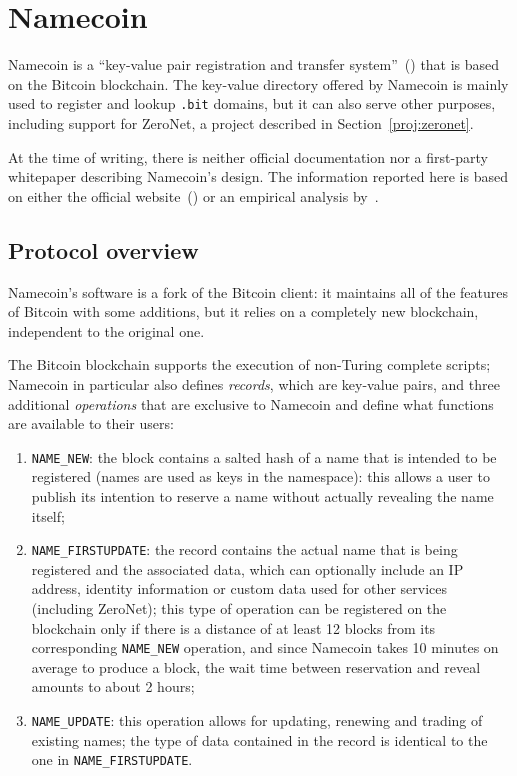 \documentclass[mscthesis]{usiinfthesis}
\begin{document}
\section{Namecoin}\label{proj:namecoin}

Namecoin is a ``key-value pair registration and transfer system''~(\cite{namecoin}) that is based on the Bitcoin blockchain. The key-value directory offered by Namecoin is mainly used to register and lookup \texttt{.bit} domains, but it can also serve other purposes, including support for ZeroNet, a project described in Section~\ref{proj:zeronet}.

At the time of writing, there is neither official documentation nor a first-party whitepaper describing Namecoin's design. The information reported here is based on either the official website~(\cite{namecoin}) or an empirical analysis by~\cite{kalodner2015empirical}.

\subsection{Protocol overview}\label{sec:namecoindesc}
Namecoin's software is a fork of the Bitcoin client: it maintains all of the features of Bitcoin with some additions, but it relies on a completely new blockchain, independent to the original one.

The Bitcoin blockchain supports the execution of non-Turing complete scripts; Namecoin in particular also defines \emph{records}, which are key-value pairs, and three additional \emph{operations} that are exclusive to Namecoin and define what functions are available to their users:
\begin{enumerate}
	\item \texttt{NAME\_NEW}: the block contains a salted hash of a name that is intended to be registered (names are used as keys in the namespace): this allows a user to publish its intention to reserve a name without actually revealing the name itself;
	\item \texttt{NAME\_FIRSTUPDATE}: the record contains the actual name that is being registered and the associated data, which can optionally include an IP address, identity information or custom data used for other services (including ZeroNet); this type of operation can be registered on the blockchain only if there is a distance of at least 12 blocks from its corresponding \texttt{NAME\_NEW} operation, and since Namecoin takes 10 minutes on average to produce a block, the wait time between reservation and reveal amounts to about 2 hours;
	\item \texttt{NAME\_UPDATE}: this operation allows for updating, renewing and trading of existing names; the type of data contained in the record is identical to the one in \texttt{NAME\_FIRSTUPDATE}.
\end{enumerate}
\end{document}
